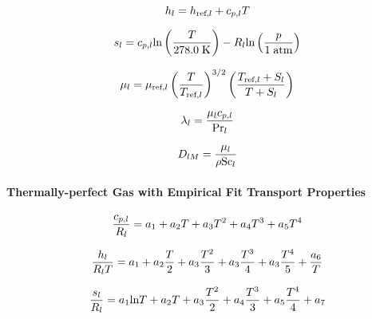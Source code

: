 \begin{equation}\label{eq:cpgEnthSpec}
	h_{l} = h_{\text{ref,\ensuremath{l}}} + c_{p,l} T
\end{equation}

\begin{equation}\label{eq:cpgEntropySpec}
	s_{l} = c_{p,l} \text{ln}\left(\frac{T}{278.0 \; \text{K}}\right) - R_{l} \text{ln}\left(\frac{p}{1 \; \text{atm}}\right)
\end{equation}

\begin{equation}\label{eq:viscSuthSpec}
	\mu_{l} = \mu_{\text{ref}, l} \left( \frac{T}{T_{\text{ref},l}} \right)^{3/2} \left( \frac{T_{\text{ref}, l} + S_{l}}{T + S_{l}} \right)
\end{equation}

\begin{equation}\label{eq:cpgThermCondSpec}
	\lambda_{l} = \frac{\mu_{l} c_{p,l}}{\text{Pr}_{l}}
\end{equation}

\begin{equation}\label{eq:cpgMassDiffSpec}
	D_{l M} = \frac{\mu_{l}}{\rho \text{Sc}_{l}}
\end{equation}

\paragraph*{Thermally-perfect Gas with Empirical Fit Transport Properties}

\begin{equation}
	\frac{c_{p,l}}{R_{l}} = a_1 + a_2 T + a_3 T^2 + a_4 T^3 + a_5 T^4
\end{equation}

\begin{equation}
	\frac{h_{l}}{R_{l} T} = a_1 + a_2 \frac{T}{2} + a_3 \frac{T^2}{3} + a_3 \frac{T^3}{4} + a_3 \frac{T^4}{5} + \frac{a_6}{T}
\end{equation}

\begin{equation}
	\frac{s_{l}}{R_{l}} = a_1 \text{ln}T + a_2 T + a_3 \frac{T^2}{2} + a_4 \frac{T^3}{3} + a_5 \frac{T^4}{4} + a_7
\end{equation}

